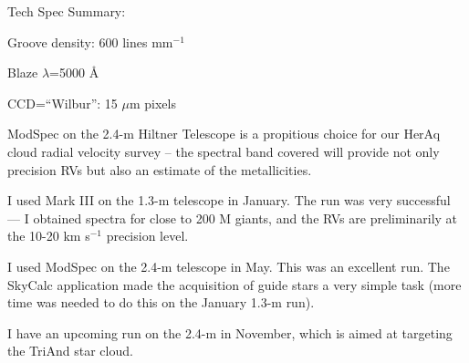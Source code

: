Tech Spec Summary:

Groove density: 600 lines mm$^{-1}$

Blaze $\lambda$=5000 \AA

CCD=``Wilbur'': 15 $\mu$m pixels

%
%

\whymdm
ModSpec on the 2.4-m Hiltner Telescope is a propitious choice for our HerAq cloud radial velocity survey -- the spectral band covered will provide not only precision RVs but also an estimate of the metallicities.
%

\thepast
I used Mark III on the 1.3-m telescope in January.
The run was very successful --- I obtained spectra for close to 200 M giants, and the RVs are preliminarily at the 10-20 km s$^{-1}$ precision level.

I used ModSpec on the 2.4-m telescope in May.
This was an excellent run.  The SkyCalc application made the acquisition of guide stars a very simple task (more time was needed to do this on the January 1.3-m run).

I have an upcoming run on the 2.4-m in November, which is aimed at targeting the TriAnd star cloud.





